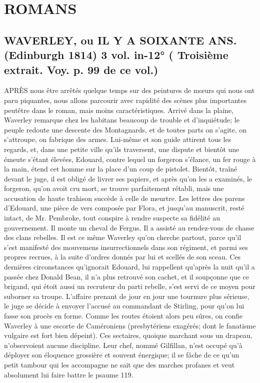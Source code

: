 \setcounter{page}{216}
\chapter{ROMANS}
\section{WAVERLEY, ou IL Y A SOIXANTE ANS. (Edinburgh 1814) 3 vol. in-12° \large{( Troisième extrait. Voy. p. 99 de ce vol.)}}

APRÈS nous être arrêtés quelque temps sur des peintures de mœurs qui nous ont paru piquantes, nous allons parcourir avec rapidité des scènes plus importantes peutêtre dans le roman, mais moins caractéristiques. Arrivé dans la plaine, Waverley remarque chez les habitans beaucoup de trouble et d’inquiétude; le peuple redoute une descente des Montagnards, et de toutes parts on s’agite, on s’attroupe, on fabrique des armes. Lui-même et son guide attirent tous les regards, et, dans une petite ville qu’ils traversent, une dispute et bientôt une émeute s’étant élevées, Edouard, contre lequel un forgeron s’élance, un fer rouge à la main, étend cet homme sur la place d’un coup de pistolet. Bientôt, traîné devant le juge, il est obligé de livrer ses papiers, et après qu’on les a examinés, le forgeron, qu’on avoit cru mort, se trouve parfaitement rétabli, mais\setcounter{page}{217} une accusation de haute trahison succède à celle de meurtre. Les lettres des parens d'Edouard, une pièce de vers composée par Flora, et jusqu'au manuscrit, resté intact, de Mr. Pembroke, tout conspire à rendre suspecte sa fidélité au gouvernement. Il monte un cheval de Fergus. Il a assisté au rendez-vous de chasse des clans rebelles. Il est ce même Waverley qu'on cherche partout, parce qu'il s'est manifesté des mouvemens insurrectionnels dans son régiment, et parmi ses propres recrues, à la suite d'ordres donnés par lui et scellés de son sceau. Ces dernières circonstances qu'ignorait Edouard, lui rappellent qu'après la nuit qu'il a passée chez Donald Bean, il n'a plus retrouvé son cachet, et il soupçonne que ce brigand, qui étoit aussi un recruteur du parti rebelle, s'est servi de ce moyen pour suborner sa troupe. L'affaire prenant de jour en jour une tournure plus sérieuse, le juge se décide à envoyer l'accusé au commandant de Stirling, pour qu'on lui fasse son procès en forme. Comme les routes étoient alors peu sûres, on confie Waverley à une escorte de Caméroniens (presbytériens exagérés; dont le fanatisme vulgaire est fort bien dépeint). Ces sectaires, quoique marchant sous un drapeau, n'observoient aucune discipline. Leur chef,\setcounter{page}{218} nommé Gilfillan, n'est occupé qu'à déployer son éloquence grossière et souvent énergique; il se fâche de ce qu'un petit tambour qui les accompagne ne sait que des marches profanes et veut absolument lui faire battre le psaume 119.
